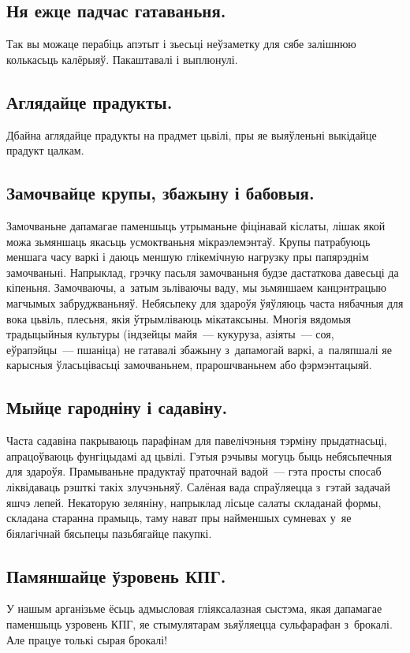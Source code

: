 \subsection{Ня ежце падчас гатаваньня.}
Так вы можаце перабіць апэтыт і зьесьці неўзаметку для сябе залішнюю колькасьць калёрыяў. Пакаштавалі і выплюнулі.

\subsection{Аглядайце прадукты.}
Дбайна аглядайце прадукты на прадмет цьвілі, пры яе выяўленьні выкідайце прадукт цалкам.

\subsection{Замочвайце крупы, збажыну і бабовыя.}
Замочваньне дапамагае паменшыць утрыманьне фіцінавай кіслаты, лішак якой можа зьмяншаць якасьць усмоктваньня мікраэлемэнтаў. Крупы патрабуюць меншага часу варкі і даюць меншую глікемічную нагрузку пры папярэднім замочваньні. Напрыклад, грэчку пасьля замочваньня будзе дастаткова давесьці да кіпеньня. Замочваючы, а~затым зьліваючы ваду, мы зьмяншаем канцэнтрацыю магчымых забруджваньняў. Небясьпеку для здароўя ўяўляюць часта нябачныя для вока цьвіль, плесьня, якія ўтрымліваюць мікатаксыны. Многія вядомыя традыцыйныя культуры (індзейцы майя~--- кукуруза, азіяты~--- соя, еўрапэйцы~--- пшаніца) не гатавалі збажыну з~дапамогай варкі, а~паляпшалі яе карысныя ўласьцівасьці замочваньнем, прарошчваньнем або фэрмэнтацыяй.

\subsection{Мыйце гародніну і садавіну.}
Часта садавіна пакрываюць парафінам для павелічэньня тэрміну прыдатнасьці, апрацоўваюць фунгіцыдамі ад цьвілі. Гэтыя рэчывы могуць быць небясьпечныя для здароўя. Прамываньне прадуктаў праточнай вадой~--- гэта просты спосаб ліквідаваць рэшткі такіх злучэньняў. Салёная вада спраўляецца з~гэтай задачай яшчэ лепей. Некаторую зеляніну, напрыклад лісьце салаты складанай формы, складана старанна прамыць, таму нават пры найменшых сумневах у~яе біялагічнай бясьпецы пазьбягайце пакупкі.

\subsection{Памяншайце ўзровень КПГ.}
У нашым арганізьме ёсьць адмысловая гліяксалазная сыстэма, якая дапамагае паменшыць узровень КПГ, яе стымулятарам зьяўляецца сульфарафан з~брокалі. Але працуе толькі сырая брокалі!


